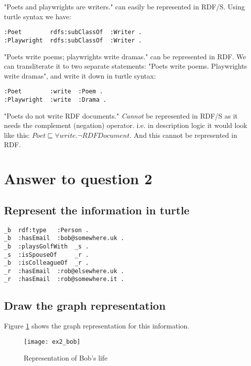 \documentclass[a4paper,12pt]{article}
\begin{document}
"Poets and playwrights are writers." can easily be represented in RDF/S.
Using turtle syntax we have:
\begin{Verbatim}[samepage=true]
:Poet        rdfs:subClassOf  :Writer .
:Playwright  rdfs:subClassOf  :Writer .
\end{Verbatim}

"Poets write poems; playwrights write dramas." can be represented in RDF.  We
can transliterate it to two separate statements:  "Poets write poems.
Playwrights write dramas", and write it down in turtle syntax:
\begin{Verbatim}[samepage=true]
:Poet        :write  :Poem .
:Playwright  :write  :Drama .
\end{Verbatim}

"Poets do not write RDF documents." \emph{Cannot} be represented in RDF/S as it
needs the complement (negation) operator.  i.e. in description logic it would
look like this: $Poet \sqsubseteq \forall write . \neg RDFDocument$.  And this
cannot be represented in RDF.

\section[Question 2]{Answer to question 2}

\subsection[Turtle]{Represent the information in turtle}
\begin{Verbatim}[samepage=true]
_b  rdf:type   :Person .
_b  :hasEmail  :bob@somewhere.uk .
_b  :playsGolfWith  _s .
_s  :isSpouseOf     _r .
_b  :isColleagueOf  _r .
_r  :hasEmail  :rob@elsewhere.uk .
_r  :hasEmail  :rob@somewhere.it .
\end{Verbatim}

\subsection[Graph]{Draw the graph representation}
Figure \ref{bobslife} shows the graph representation for this information.
\begin{figure}[!htp]
\centering
\texttt{[image: ex2\_bob]}
\caption{Representation of Bob's life}
\label{bobslife}
\end{figure}
\end{document}
